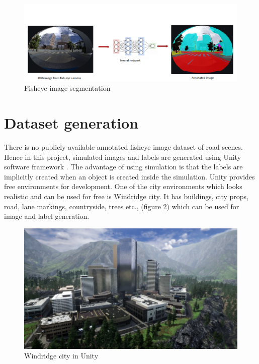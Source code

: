 \documentclass[a4paper, 12pt, oneside, BCOR1cm,toc=chapterentrywithdots]{scrbook}
\begin{document}
\begin{figure}[h]
\centering
\includegraphics[width=1\textwidth]{fisheyesegment.png}
\caption{Fisheye image segmentation}
\label{fisheyesegment}
\end{figure}

\section{Dataset generation}

There is no publicly-available annotated fisheye image dataset of road scenes. Hence in this project, simulated images and labels are generated using Unity software framework \cite{unity3d}. The advantage of using simulation is that the labels are implicitly created when an object is created inside the simulation. Unity provides free environments for development. One of the city environments which looks realistic and can be used for free is Windridge city. It has buildings, city props, road, lane markings, countryside, trees etc., (figure \ref{windridge}) which can be used for image and label generation.

\begin{figure}[h]
\centering
\includegraphics[width=1\textwidth]{windridge.jpg}
\caption{Windridge city in Unity}
\label{windridge}
\end{figure}
 
\end{document}
